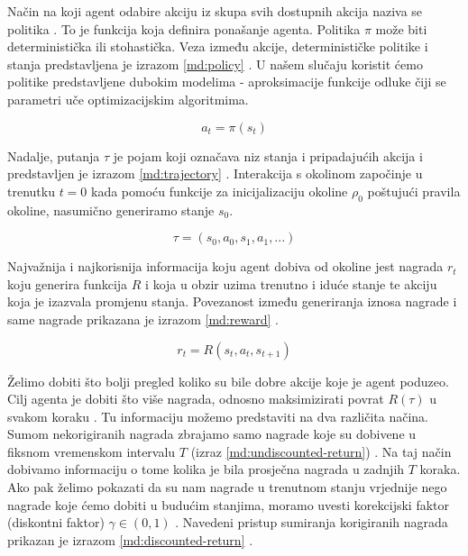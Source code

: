 Način na koji agent odabire akciju iz skupa svih dostupnih akcija naziva se politika . To je funkcija koja definira ponašanje agenta. Politika $\pi$ može biti deterministička ili stohastička. Veza između akcije, determinističke politike i stanja predstavljena je izrazom \ref{md:policy} \cite{PodUceFer}. U našem slučaju koristit ćemo politike predstavljene dubokim modelima - aproksimacije funkcije odluke čiji se parametri uče optimizacijskim algoritmima.  

\begin{equation}
    \label{md:policy}
    a_t = \pi(s_t)
\end{equation}

\bigskip

Nadalje, putanja $\tau$  je pojam koji označava niz stanja i pripadajućih akcija i predstavljen je izrazom \ref{md:trajectory} \cite{SpinningUp}. Interakcija s okolinom započinje u trenutku $t = 0$ kada pomoću funkcije za inicijalizaciju okoline $\rho_0$ poštujući pravila okoline, nasumično generiramo stanje $s_0$.

\begin{equation}
    \label{md:trajectory}
    \tau = (s_0, a_0, s_1, a_1, ...)
\end{equation}

\bigskip

Najvažnija i najkorisnija informacija koju agent dobiva od okoline jest nagrada $r_t$  koju generira funkcija $R$  i koja u obzir uzima trenutno i iduće stanje te akciju koja je izazvala promjenu stanja. Povezanost između generiranja iznosa nagrade i same nagrade prikazana je izrazom \ref{md:reward} \cite{SpinningUp}.

\begin{equation}
    \label{md:reward}
    r_t = R(s_t, a_t, s_{t+1})
\end{equation}

\bigskip

Želimo dobiti što bolji pregled koliko su bile dobre akcije koje je agent poduzeo. Cilj agenta je dobiti što više nagrada, odnosno maksimizirati povrat  $R(\tau)$ u svakom koraku \cite{PodUceFer}. Tu informaciju možemo predstaviti na dva različita načina. Sumom nekorigiranih nagrada zbrajamo samo nagrade koje su dobivene u fiksnom vremenskom intervalu $T$ (izraz \ref{md:undiscounted-return}) \cite{SpinningUp}. Na taj način dobivamo informaciju o tome kolika je bila prosječna nagrada u zadnjih $T$ koraka. Ako pak želimo pokazati da su nam nagrade u trenutnom stanju vrjednije nego nagrade koje ćemo dobiti u budućim stanjima, moramo uvesti korekcijski faktor (diskontni faktor) $\gamma \in (0,1)$ . Navedeni pristup sumiranja korigiranih nagrada prikazan je izrazom \ref{md:discounted-return} \cite{SpinningUp}.

